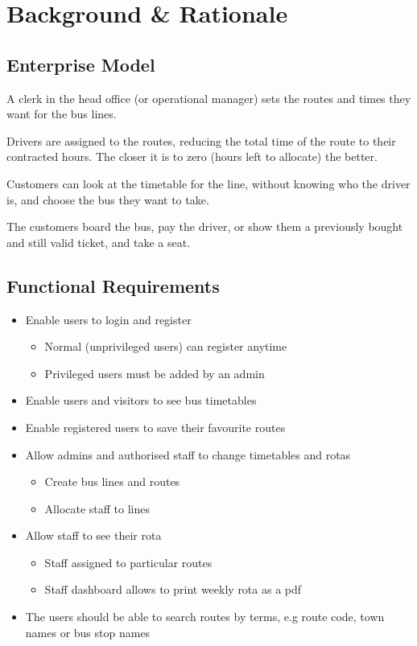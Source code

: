 \chapter{Background \& Rationale}

\section{Enterprise Model}

A clerk in the head office (or operational manager) sets the routes and times they want for the bus lines.

Drivers are assigned to the routes, reducing the total time of the route to their contracted hours. The closer it is to zero (hours left to allocate) the better.

Customers can look at the timetable for the line, without knowing who the driver is, and choose the bus they want to take.

The customers board the bus, pay the driver, or show them a previously bought and still valid ticket, and take a seat.

\section{Functional Requirements}

\begin{itemize}
  \item Enable users to login and register
    \begin{itemize}
      \item Normal (unprivileged users) can register anytime
      \item Privileged users must be added by an admin
    \end{itemize}
  \item Enable users and visitors to see bus timetables
  \item Enable registered users to save their favourite routes
  \item Allow admins and authorised staff to change timetables and rotas
    \begin{itemize}
      \item Create bus lines and routes
      \item Allocate staff to lines
    \end{itemize}
  \item Allow staff to see their rota
    \begin{itemize}
      \item Staff assigned to particular routes
      \item Staff dashboard allows to print weekly rota as a pdf
    \end{itemize}
  \item The users should be able to search routes by terms, e.g route code, town names or bus stop names
\end{itemize}

